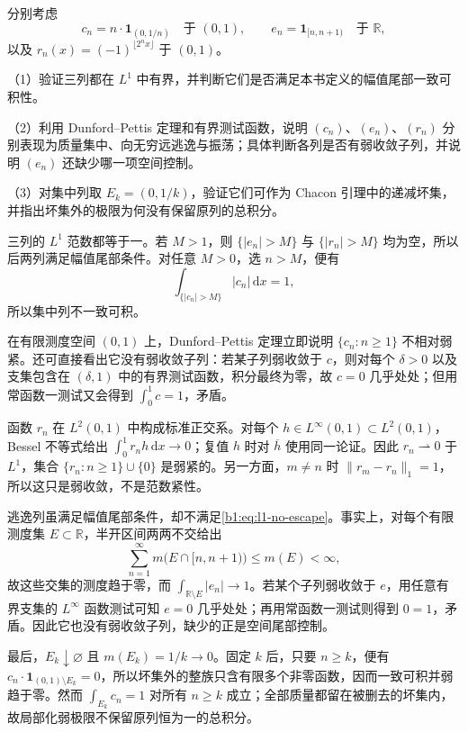 \begin{optionalexercise}[集中、逃逸与振荡]\label{b1:ex:10-endpoint-three-mechanisms}
分别考虑
\[
 c_n=n\cdot\mathbf1_{(0,1/n)}\quad\text{于 }(0,1),
 \qquad
 e_n=\mathbf1_{[n,n+1)}\quad\text{于 }\mathbb R,
\]
以及 \(r_n(x)=(-1)^{\lfloor2^nx\rfloor}\) 于 \((0,1)\)。

\ProseParagraphBreak

（1）验证三列都在 \(L^1\) 中有界，并判断它们是否满足本书定义的幅值尾部一致可积性。

\ProseParagraphBreak

（2）利用 Dunford--Pettis 定理和有界测试函数，说明 \((c_n)\)、\((e_n)\)、\((r_n)\) 分别表现为质量集中、向无穷远逃逸与振荡；具体判断各列是否有弱收敛子列，并说明 \((e_n)\) 还缺少哪一项空间控制。

\ProseParagraphBreak

（3）对集中列取 \(E_k=(0,1/k)\)，验证它们可作为 Chacon 引理中的递减坏集，并指出坏集外的极限为何没有保留原列的总积分。
\end{optionalexercise}
\begin{solution}
三列的 \(L^1\) 范数都等于一。若 \(M>1\)，则 \(\{|e_n|>M\}\) 与 \(\{|r_n|>M\}\) 均为空，所以后两列满足幅值尾部条件。对任意 \(M>0\)，选 \(n>M\)，便有
\[
 \int_{\{|c_n|>M\}}|c_n|\,\mathrm dx=1,
\]
所以集中列不一致可积。

在有限测度空间 \((0,1)\) 上，Dunford--Pettis 定理立即说明 \(\{c_n:n\geq1\}\) 不相对弱紧。还可直接看出它没有弱收敛子列：若某子列弱收敛于 \(c\)，则对每个 \(\delta>0\) 以及支集包含在 \((\delta,1)\) 中的有界测试函数，积分最终为零，故 \(c=0\) 几乎处处；但用常函数一测试又会得到 \(\int_0^1c=1\)，矛盾。

函数 \(r_n\) 在 \(L^2(0,1)\) 中构成标准正交系。对每个 \(h\in L^\infty(0,1)\subset L^2(0,1)\)，Bessel 不等式给出 \(\int_0^1r_nh\,\mathrm dx\to0\)；复值 \(h\) 时对 \(\overline h\) 使用同一论证。因此 \(r_n\rightharpoonup0\) 于 \(L^1\)，集合 \(\{r_n:n\geq1\}\cup\{0\}\) 是弱紧的。另一方面，\(m\ne n\) 时 \(\|r_m-r_n\|_1=1\)，所以这只是弱收敛，不是范数紧性。

逃逸列虽满足幅值尾部条件，却不满足\eqref{b1:eq:l1-no-escape}。事实上，对每个有限测度集 \(E\subset\mathbb R\)，半开区间两两不交给出
\[
 \sum_{n=1}^\infty m\bigl(E\cap[n,n+1)\bigr)\leq m(E)<\infty,
\]
故这些交集的测度趋于零，而 \(\int_{\mathbb R\setminus E}|e_n|\to1\)。若某个子列弱收敛于 \(e\)，用任意有界支集的 \(L^\infty\) 函数测试可知 \(e=0\) 几乎处处；再用常函数一测试则得到 \(0=1\)，矛盾。因此它也没有弱收敛子列，缺少的正是空间尾部控制。

最后，\(E_k\downarrow\varnothing\) 且 \(m(E_k)=1/k\to0\)。固定 \(k\) 后，只要 \(n\geq k\)，便有 \(c_n\cdot\mathbf1_{(0,1)\setminus E_k}=0\)，所以坏集外的整族只含有限多个非零函数，因而一致可积并弱趋于零。然而
\(\int_{E_k}c_n=1\) 对所有 \(n\geq k\) 成立；全部质量都留在被删去的坏集内，故局部化弱极限不保留原列恒为一的总积分。
\end{solution}

